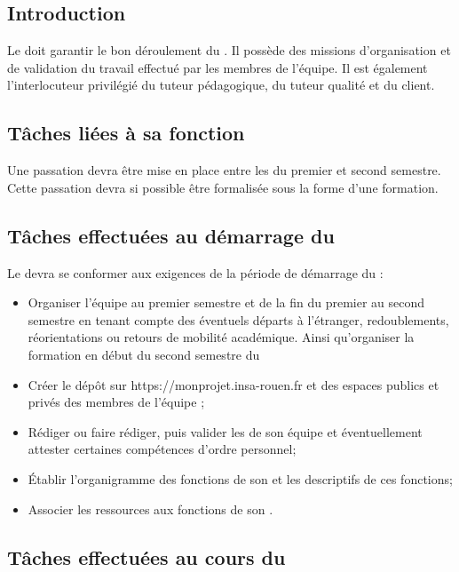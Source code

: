 
\subsection*{Introduction}


Le \CP{} doit garantir le bon déroulement du \PICCourt. Il possède des missions d’organisation et de validation du travail effectué par les membres de l’équipe. Il est également l’interlocuteur privilégié du tuteur pédagogique, du tuteur qualité et du client.

\subsection*{Tâches liées à sa fonction}

Une passation devra être mise en place entre les \CPs{} du premier et second semestre. Cette passation devra si possible être formalisée sous la forme d’une formation.

\subsection*{Tâches effectuées au démarrage du \PICCourt}

Le \CP{} devra se conformer aux exigences de la période de démarrage du \PICCourt :
\begin{itemize}
	\item Organiser l’équipe \PICCourt au premier semestre et de la fin du premier au second semestre en tenant compte des éventuels départs à l’étranger, redoublements, réorientations ou retours de mobilité académique. Ainsi qu’organiser la formation en début du second semestre du \PICCourt

	\item Créer le dépôt \git{} sur https://monprojet.insa-rouen.fr et des espaces publics et privés des membres de l’équipe \PICCourt ;
	\item Rédiger ou faire rédiger, puis valider les \FC{} de son équipe et éventuellement attester certaines compétences d’ordre personnel;
	\item Établir l’organigramme des fonctions de son \PICCourt et les descriptifs de ces fonctions;
	\item Associer les ressources aux fonctions de son \PICCourt.
\end{itemize}

\subsection*{Tâches effectuées au cours du \PICCourt}

